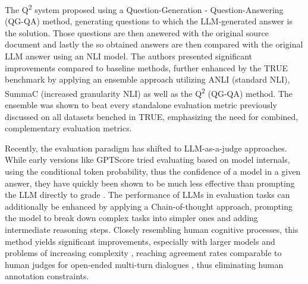 The Q\textsuperscript{2} system  \cite{q2evaluatingFactualConsistencyInKnowledgeGroundedDialogues} proposed using a Question-Generation - Question-Answering (QG-QA) method, generating questions to which the LLM-generated answer is the solution. Those questions are then answered with the original source document and lastly the so obtained answers are then compared with the original LLM answer using an NLI model. The authors presented significant improvements compared to baseline methods, further enhanced by the TRUE benchmark by applying an ensemble approach utilizing ANLI (standard NLI), SummaC (increased granularity NLI) as well as the Q\textsuperscript{2} (QG-QA) method. The ensemble was shown to beat every standalone evaluation metric previously discussed on all datasets benched in TRUE, emphasizing the need for combined, complementary evaluation metrics.

Recently, the evaluation paradigm has shifted to LLM-as-a-judge approaches. While early versions like GPTScore \cite{gptScore} tried evaluating based on model internals, using the conditional token probability, thus the confidence of a model in a given answer, they have quickly been shown to be much less effective than prompting the LLM directly to grade \cite{gval}. The performance of LLMs in evaluation tasks can additionally be enhanced by applying a Chain-of-thought approach, prompting the model to break down complex tasks into simpler ones and adding intermediate reasoning steps. Closely resembling human cognitive processes, this method yields significant improvements, especially with larger models and problems of increasing complexity \cite{chainOfThoughtPrompting}, reaching agreement rates comparable to human judges for open-ended multi-turn dialogues \cite{judgingLLMAsAJudgeMTBench}, thus eliminating human annotation constraints. 

